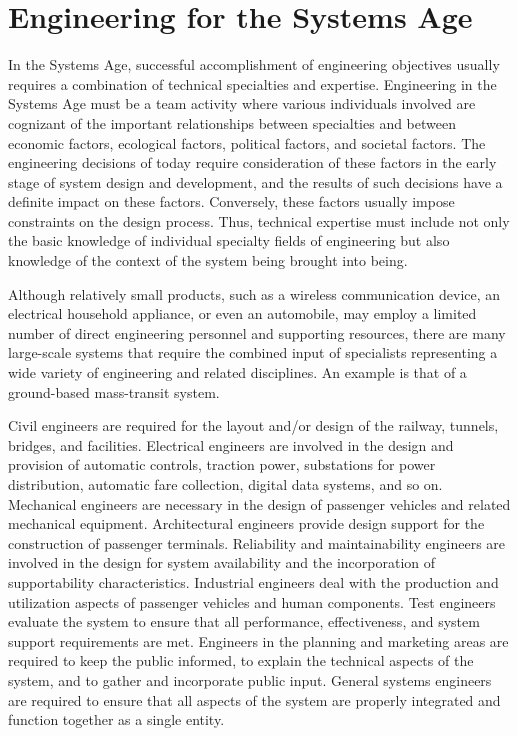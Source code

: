 \section{Engineering for the Systems Age}

In the Systems Age, successful accomplishment of engineering objectives usually requires a combination of technical specialties and expertise. Engineering in the Systems Age must be a team activity where various individuals involved are cognizant of the important relationships between specialties and between economic factors, ecological factors, political factors, and societal factors. The engineering decisions of today require consideration of these factors in the early stage of system design and development, and the results of such decisions have a definite impact on these factors. Conversely, these factors usually impose constraints on the design process. Thus, technical expertise must include not only the basic knowledge of individual specialty fields of engineering but also knowledge of the context of the system being brought into being.

Although relatively small products, such as a wireless communication device, an electrical household appliance, or even an automobile, may employ a limited number of direct engineering personnel and supporting resources, there are many large-scale systems that require the combined input of specialists representing a wide variety of engineering and related disciplines. An example is that of a ground-based mass-transit system.

Civil engineers are required for the layout and/or design of the railway, tunnels, bridges, and facilities. Electrical engineers are involved in the design and provision of automatic controls, traction power, substations for power distribution, automatic fare collection, digital data systems, and so on. Mechanical engineers are necessary in the design of passenger vehicles and related mechanical equipment. Architectural engineers provide design support for the construction of passenger terminals. Reliability and maintainability engineers are involved in the design for system availability and the incorporation of supportability characteristics. Industrial engineers deal with the production and utilization aspects of passenger vehicles and human components. Test engineers evaluate the system to ensure that all performance, effectiveness, and system support requirements are met. Engineers in the planning and marketing areas are required to keep the public informed, to explain the technical aspects of the system, and to gather and incorporate public input. General systems engineers are required to ensure that all aspects of the system are properly integrated and function together as a single entity.

